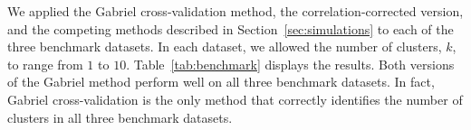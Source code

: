 \documentclass[12pt]{article}
\begin{document}
We applied the Gabriel cross-validation method, the correlation-corrected
version, and the competing methods described in Section~\ref{sec:simulations}
to each of the three benchmark datasets.  In each dataset, we allowed the
number of clusters, $k$, to range from $1$ to $10$.  Table~\ref{tab:benchmark}
displays the results.  Both versions of the Gabriel method perform well on all
three benchmark datasets. In fact, Gabriel cross-validation is the only method
that correctly identifies the number of clusters in all three benchmark
datasets.


\end{document}
